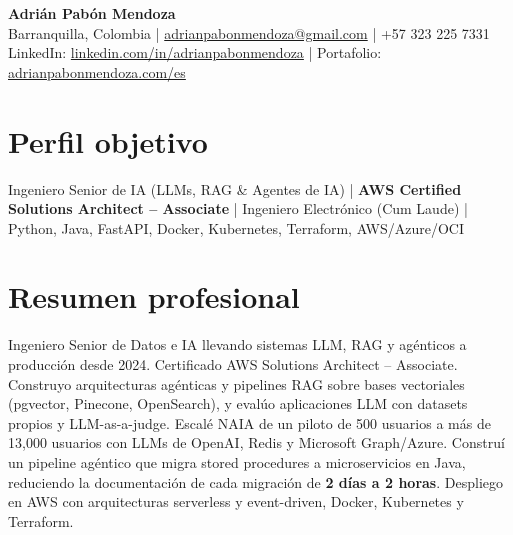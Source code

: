 \documentclass[letterpaper,10pt]{article}
\begin{document}
\begin{center}
  {\LARGE \textbf{Adrián Pabón Mendoza}} \\[4pt]
  Barranquilla, Colombia \;|\;
  \href{mailto:adrianpabonmendoza@gmail.com}{adrianpabonmendoza@gmail.com} \;|\;
  +57 323 225 7331 \\[2pt]
  LinkedIn: \href{https://www.linkedin.com/in/adrianpabonmendoza/}{linkedin.com/in/adrianpabonmendoza} \;|\;
  Portafolio: \href{https://www.adrianpabonmendoza.com/es/}{adrianpabonmendoza.com/es}
\end{center}

\section{Perfil objetivo}
\small
Ingeniero Senior de IA (LLMs, RAG \& Agentes de IA) \;|\; \textbf{AWS Certified Solutions Architect -- Associate} \;|\; Ingeniero Electrónico (Cum Laude) \;|\; Python, Java, FastAPI, Docker, Kubernetes, Terraform, AWS/Azure/OCI

\section{Resumen profesional}
\small
Ingeniero Senior de Datos e IA llevando sistemas LLM, RAG y agénticos a producción desde 2024. Certificado AWS Solutions Architect -- Associate. Construyo arquitecturas agénticas y pipelines RAG sobre bases vectoriales (pgvector, Pinecone, OpenSearch), y evalúo aplicaciones LLM con datasets propios y LLM-as-a-judge. Escalé NAIA de un piloto de 500 usuarios a más de 13{,}000 usuarios con LLMs de OpenAI, Redis y Microsoft Graph/Azure. Construí un pipeline agéntico que migra stored procedures a microservicios en Java, reduciendo la documentación de cada migración de \textbf{2 días a 2 horas}. Despliego en AWS con arquitecturas serverless y event-driven, Docker, Kubernetes y Terraform.

\end{document}
